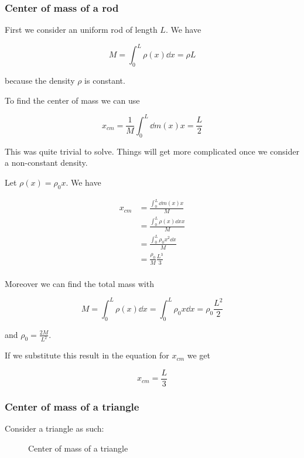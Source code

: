 \documentclass[10pt]{extarticle}
\begin{document}
\subsubsection{Center of mass of a rod}

First we consider an uniform rod of length $L$.
We have

$$
    M = \int_0^L \rho(x) \dd{x} = \rho L
$$

because the density $\rho$ is constant.

To find the center of mass we can use

$$
    x_{cm} = \frac{1}{M} \int_0^L \dd{m}(x) x = \frac{L}{2}
$$

This was quite trivial to solve. Things will get more complicated once we consider a non-constant density.

Let $\rho(x) = \rho_0 x$. We have

\begin{align*}
    x_{cm} & = \frac{\int_0^L \dd{m}(x) x}{M}       \\
           & = \frac{\int_0^L \rho(x) \dd{x} x}{M}  \\
           & = \frac{\int_0^L \rho_0 x^2 \dd{x}}{M} \\
           & = \frac{\rho_0}{M} \frac{L^3}{3}       \\
\end{align*}

Moreover we can find the total mass with

$$
    M = \int_0^L \rho(x) \dd{x} = \int_0^L \rho_0 x \dd{x} = \rho_0 \frac{L^2}{2}
$$

and $\rho_0 = \frac{2M}{L^2}$.

If we substitute this result in the equation for $x_{cm}$ we get

$$
    x_{cm} = \frac{L}{3}
$$

\subsubsection{Center of mass of a triangle}

Consider a triangle as such:

\begin{figure}[H]
    \centering
    \caption{Center of mass of a triangle}
    \label{fig:cm_triangle}
\end{figure}
\end{document}
